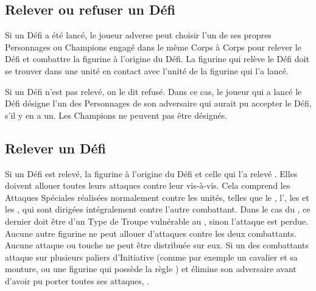\subsection{Relever ou refuser un Défi}

Si un Défi a été lancé, le joueur adverse peut choisir l'un de ses propres Personnages ou Champions engagé dans le même Corps à Corps pour relever le Défi et combattre la figurine à l'origine du Défi. La figurine qui relève le Défi doit se trouver dans une unité en contact avec l'unité de la figurine qui l'a lancé.

Si un Défi n'est pas relevé, on le dit refusé. Dans ce cas, le joueur qui a lancé le Défi désigne l'un des Personnages de son adversaire qui aurait pu accepter le Défi, s'il y en a un. Les Champions ne peuvent pas être désignés. 

\subsection{Relever un Défi}
\label{fighting_a_challenge}

Si un Défi est relevé, la figurine à l'origine du Défi et celle qui l'a relevé . Elles doivent allouer toutes leurs attaques contre leur vis-à-vis. Cela comprend les Attaques Spéciales réalisées normalement contre les unités, telles que le \stomp{}, l'\breathweapon{}, les \impacthits{} et les \grindingattacks{}, qui sont dirigées intégralement contre l'autre combattant. Dans le cas du \stomp{}, ce dernier doit être d'un Type de Troupe vulnérable au \stomp{}, sinon l'attaque est perdue. Aucune autre figurine ne peut allouer d'attaques contre les deux combattants. Aucune attaque ou touche ne peut être distribuée sur eux. Si un des combattants attaque sur plusieurs paliers d'Initiative (comme par exemple un cavalier et sa monture, ou une figurine qui possède la règle \stomp{}) et élimine son adversaire avant d'avoir pu porter toutes ses attaques, .

